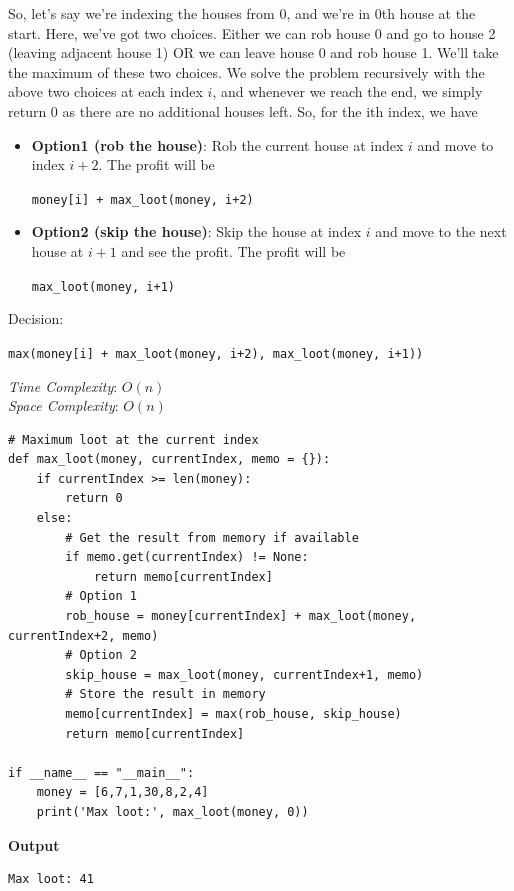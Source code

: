 \documentclass[a4paper,11pt]{book}
\begin{document}
\noindent So, let's say we're indexing the houses from 0, and we're in 0th house at the start. Here, we've got two choices. Either we can rob house 0 and go to house 2 (leaving adjacent house 1) OR we can leave house 0 and rob house 1. We'll take the maximum of these two choices. We solve the problem recursively with the above two choices at each index $i$, and whenever we reach the end, we simply return 0 as there are no additional houses left. So, for the ith index, we have

\begin{itemize}
\item \textbf{Option1 (rob the house)}: Rob the current house at index $i$ and move to index $i+2$. The profit will be \begin{center}
\lstinline{money[i] + max_loot(money, i+2)}
\end{center}
\item \textbf{Option2 (skip the house)}: Skip the house at index $i$ and move to the next house at $i+1$ and see the profit. The profit will be \begin{center}
\lstinline{max_loot(money, i+1)}
\end{center}
\end{itemize}

\noindent Decision: \begin{center}
\lstinline{max(money[i] + max_loot(money, i+2), max_loot(money, i+1))}
\end{center}

\noindent \textit{Time Complexity}: $O(n)$\\
\noindent \textit{Space Complexity}: $O(n)$

\begin{lstlisting}
# Maximum loot at the current index
def max_loot(money, currentIndex, memo = {}):
    if currentIndex >= len(money):
        return 0
    else:
        # Get the result from memory if available
        if memo.get(currentIndex) != None:
            return memo[currentIndex]
        # Option 1
        rob_house = money[currentIndex] + max_loot(money, currentIndex+2, memo)
        # Option 2
        skip_house = max_loot(money, currentIndex+1, memo)
        # Store the result in memory
        memo[currentIndex] = max(rob_house, skip_house)
        return memo[currentIndex]

if __name__ == "__main__":
    money = [6,7,1,30,8,2,4]
    print('Max loot:', max_loot(money, 0))
\end{lstlisting}
\textbf{Output}
\begin{lstlisting}
Max loot: 41
\end{lstlisting}
\end{document}
